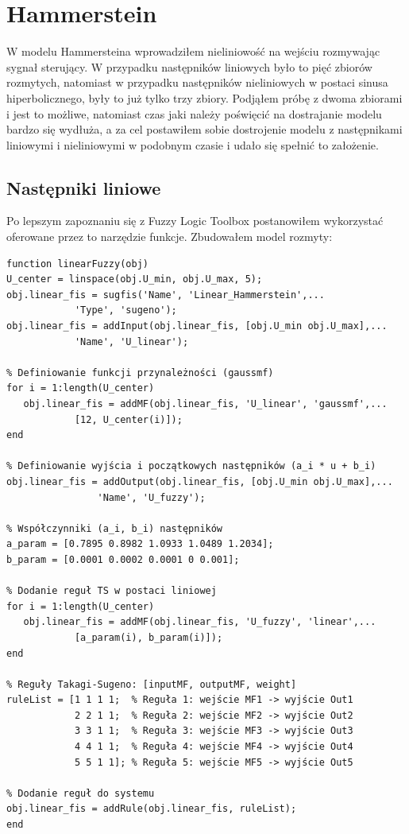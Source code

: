 \chapter{Hammerstein}
W modelu Hammersteina wprowadziłem nieliniowość na wejściu rozmywając sygnał sterujący. W przypadku następników liniowych było to pięć zbiorów rozmytych, natomiast w przypadku następników nieliniowych w postaci sinusa hiperbolicznego, były to już tylko trzy zbiory. Podjąłem próbę z dwoma zbiorami i jest to możliwe, natomiast czas jaki należy poświęcić na dostrajanie modelu bardzo się wydłuża, a za cel postawiłem sobie dostrojenie modelu z następnikami liniowymi i nieliniowymi w podobnym czasie i udało się spełnić to założenie.

\newpage

\section{Następniki liniowe}
Po lepszym zapoznaniu się z Fuzzy Logic Toolbox postanowiłem wykorzystać oferowane przez to narzędzie funkcje. Zbudowałem model rozmyty:

\begin{lstlisting}[style=Matlab-editor]
function linearFuzzy(obj)
U_center = linspace(obj.U_min, obj.U_max, 5);
obj.linear_fis = sugfis('Name', 'Linear_Hammerstein',...
			'Type', 'sugeno');
obj.linear_fis = addInput(obj.linear_fis, [obj.U_min obj.U_max],...
			'Name', 'U_linear');
            
% Definiowanie funkcji przynależności (gaussmf)
for i = 1:length(U_center)
   obj.linear_fis = addMF(obj.linear_fis, 'U_linear', 'gaussmf',...
			[12, U_center(i)]);
end
            
% Definiowanie wyjścia i początkowych następników (a_i * u + b_i)
obj.linear_fis = addOutput(obj.linear_fis, [obj.U_min obj.U_max],...
				'Name', 'U_fuzzy');
            
% Współczynniki (a_i, b_i) następników
a_param = [0.7895 0.8982 1.0933 1.0489 1.2034];
b_param = [0.0001 0.0002 0.0001 0 0.001];
            
% Dodanie reguł TS w postaci liniowej
for i = 1:length(U_center)
   obj.linear_fis = addMF(obj.linear_fis, 'U_fuzzy', 'linear',...
			[a_param(i), b_param(i)]);
end
            
% Reguły Takagi-Sugeno: [inputMF, outputMF, weight]
ruleList = [1 1 1 1;  % Reguła 1: wejście MF1 -> wyjście Out1
            2 2 1 1;  % Reguła 2: wejście MF2 -> wyjście Out2
            3 3 1 1;  % Reguła 3: wejście MF3 -> wyjście Out3
            4 4 1 1;  % Reguła 4: wejście MF4 -> wyjście Out4
            5 5 1 1]; % Reguła 5: wejście MF5 -> wyjście Out5
            
% Dodanie reguł do systemu
obj.linear_fis = addRule(obj.linear_fis, ruleList);
end
\end{lstlisting}

